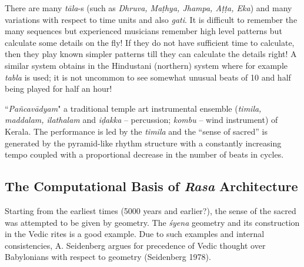 There are many \textsl{tāla}-s (such as \textsl{Dhruva, Maṭhya, Jhampa, Aṭṭa, Eka}) and many variations with respect to time units and also \textsl{gati}. It is difficult to remember the many sequences but experienced musicians remember high level patterns but calculate some details on the fly! If they do not have sufficient time to calculate, then they play known simpler patterns till they can calculate the details right! A similar system obtains in the Hindustani (northern) system where for example \textsl{tabla} is used; it is not uncommon to see somewhat unusual beats of 10 and half being played for half an hour! 

``\textsl{Pañcavādyam}" a traditional temple art instrumental ensemble (\textsl{timila, maddalam, ilathalam} and \textsl{iḍakka} -- percussion; \textsl{kombu} -- wind instrument) of Kerala. The performance is led by the \textsl{timila} and the “sense of sacred” is generated by the pyramid-like rhythm structure with a constantly increasing tempo coupled with a proportional decrease in the number of beats in cycles.\\[-20pt]


\subsection{The Computational Basis of \textsl{Rasa} Architecture}\label{chap3-sec5.3}

Starting from the earliest times (5000 years and earlier?), the sense of the sacred was attempted to be given by geometry. The \textsl{śyena} geometry and its construction in the Vedic rites is a good example. Due to such examples and internal consistencies, A. Seidenberg argues for precedence of Vedic thought over Babylonians with respect to geometry (Seidenberg 1978).

